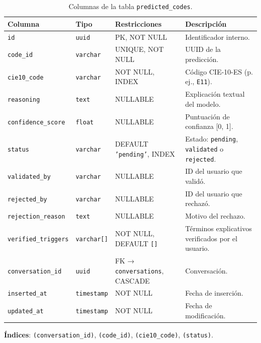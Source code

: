 \begin{table}[H]
\centering
\footnotesize
\small
\caption{Columnas de la tabla \texttt{predicted\_codes}.}
\label{tab:predicted-codes}
\begin{tabular}{llP{3.2cm}P{4.5cm}}
\hline
\textbf{Columna} & \textbf{Tipo} & \textbf{Restricciones} & \textbf{Descripción} \\
\hline
\texttt{id}               & \texttt{uuid}    & PK, NOT NULL           & Identificador interno. \\
\texttt{code\_id}         & \texttt{varchar} & UNIQUE, NOT NULL       & UUID de la predicción. \\
\texttt{cie10\_code}      & \texttt{varchar} & NOT NULL, INDEX        & Código CIE-10-ES (p. ej., \texttt{E11}). \\
\texttt{reasoning}        & \texttt{text}    & NULLABLE               & Explicación textual del modelo. \\
\texttt{confidence\_score}& \texttt{float}   & NULLABLE               & Puntuación de confianza [0, 1]. \\
\texttt{status}           & \texttt{varchar} & DEFAULT \texttt{'pending'}, INDEX & Estado: \texttt{pending}, \texttt{validated} o \texttt{rejected}. \\
\texttt{validated\_by}    & \texttt{varchar} & NULLABLE               & ID del usuario que validó. \\
\texttt{rejected\_by}     & \texttt{varchar} & NULLABLE               & ID del usuario que rechazó. \\
\texttt{rejection\_reason}& \texttt{text}    & NULLABLE               & Motivo del rechazo. \\
\texttt{verified\_triggers}& \texttt{varchar[]} & NOT NULL, DEFAULT \texttt{[]} & Términos explicativos verificados por el usuario. \\
\texttt{conversation\_id} & \texttt{uuid}    & FK → \texttt{conversations}, CASCADE & Conversación. \\
\texttt{inserted\_at}     & \texttt{timestamp} & NOT NULL           & Fecha de inserción. \\
\texttt{updated\_at}      & \texttt{timestamp} & NOT NULL           & Fecha de modificación. \\
\hline
\end{tabular}
\end{table}

\textbf{Índices}: \texttt{(conversation\_id)}, \texttt{(code\_id)}, \texttt{(cie10\_code)}, \texttt{(status)}.

